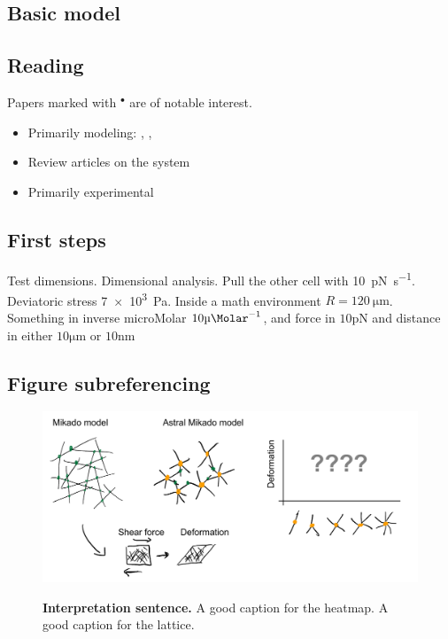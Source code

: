 \documentclass[onecolumn,11pt]{article}
\newcommand{\uM}{\si{\micro\Molar}}
\newcommand{\um}{\si{\micro\metre}}
\newcommand{\pN}{\si{\pico\newton}}
\newcommand{\nm}{\si{\nano\metre}}
\begin{document}
\subsection*{Basic model} 

\lipsum[2-5]  

\subsection*{Reading}
Papers marked with $^{\bullet}$ are of notable interest.
\begin{itemize}
\item Primarily modeling: \citet{Slaughter.2013}, \citet{Zhang.2019}, \citet{Ohadi.2019}
\item Review articles on the system \cite{kajdlkjsadjkl}
\item Primarily experimental
\end{itemize}


\subsection*{First steps} 

Test dimensions. 
Dimensional analysis. Pull the other cell with \SI{10}{\pico\newton\per\second}. Deviatoric stress \SI{7e3}{\pascal}. Inside a math environment $R=\SI{120}{\micro\meter}$. 
Something in inverse microMolar $10\uM^{-1}$, and force in $10\pN$ and distance in either $10\um$ or $10\nm$


\subsection{Figure subreferencing}

\begin{figure}[!ht]
        \centering
        \begin{subcaptiongroup}
                \includegraphics[width=174mm]{figures/figJeanJacket.pdf}
                \label{subfig:heatmap}
                \label{subfig:lattice}
                \end{subcaptiongroup}
        \captionsetup{subrefformat=parens}
        \caption{\label{fig:majorfig}\textbf{Interpretation sentence.}
                 A good caption for the heatmap. 
                 A good caption for the lattice. 
                }
\end{figure}
\end{document}
